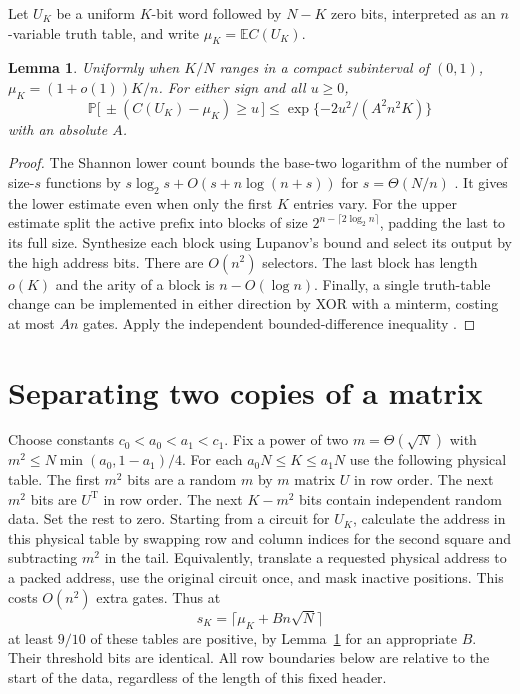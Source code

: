 \documentclass[11pt]{article}
\newtheorem{lemma}[theorem]{Lemma}
\newcommand{\E}{\mathbb E}
\newcommand{\Prob}{\mathbb P}
\begin{document}
Let $U_K$ be a uniform $K$-bit word followed by $N-K$ zero bits, interpreted as an $n$-variable truth table, and write $\mu_K=\E C(U_K)$.
\begin{lemma}\label{lem:prefix}
Uniformly when $K/N$ ranges in a compact subinterval of $(0,1)$,
$\mu_K=(1+o(1))K/n$. For either sign and all $u\ge0$,
\[
 \Prob\bigl[\,\pm(C(U_K)-\mu_K)\ge u\,\bigr]
 \le \exp\{-2u^2/(A^2 n^2 K)\}
\]
with an absolute $A$.
\end{lemma}
\begin{proof}
The Shannon lower count bounds the base-two logarithm of the number of size-$s$ functions by $s\log_2s+O(s+n\log(n+s))$ for $s=\Theta(N/n)$ \cite[Chapter~1]{jukna}. It gives the lower estimate even when only the first $K$ entries vary. For the upper estimate split the active prefix into blocks of size $2^{n-\lceil2\log_2 n\rceil}$, padding the last to its full size. Synthesize each block using Lupanov's bound \cite{lupanov} and select its output by the high address bits. There are $O(n^2)$ selectors. The last block has length $o(K)$ and the arity of a block is $n-O(\log n)$. Finally, a single truth-table change can be implemented in either direction by XOR with a minterm, costing at most $An$ gates. Apply the independent bounded-difference inequality \cite{mcdiarmid}.
\end{proof}

\section{Separating two copies of a matrix}

Choose constants $c_0<a_0<a_1<c_1$. Fix a power of two $m=\Theta(\sqrt N)$ with $m^2\le N\min(a_0,1-a_1)/4$. For each $a_0N\le K\le a_1N$ use the following physical table. The first $m^2$ bits are a random $m$ by $m$ matrix $U$ in row order. The next $m^2$ bits are $U^{\mathrm T}$ in row order. The next $K-m^2$ bits contain independent random data. Set the rest to zero. Starting from a circuit for $U_K$, calculate the address in this physical table by swapping row and column indices for the second square and subtracting $m^2$ in the tail. Equivalently, translate a requested physical address to a packed address, use the original circuit once, and mask inactive positions. This costs $O(n^2)$ extra gates. Thus at
\[
 s_K=\lceil\mu_K+B n\sqrt N\rceil
\]
at least $9/10$ of these tables are positive, by Lemma~\ref{lem:prefix} for an appropriate $B$. Their threshold bits are identical. All row boundaries below are relative to the start of the data, regardless of the length of this fixed header.
\end{document}
